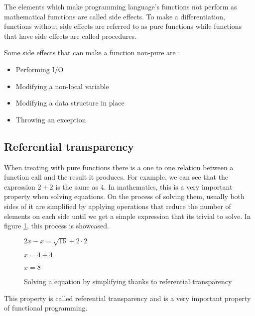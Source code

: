 \documentclass[../main.tex]{subfiles}
\begin{document}
The elements which make programming language's functions not perform as mathematical functions
are called side effects. To make a differentiation, functions without side
effects are referred to as pure functions\autocite{UsingAttributes} while
functions that have side effects are called procedures.

Some side effects that can make a function non-pure are
\autocite{SpulerCompilerEffects}:

\begin{itemize}
  \item Performing I/O
  \item Modifying a non-local variable
  \item Modifying a data structure in place
  \item Throwing an exception
\end{itemize}

%


\subsection{Referential transparency} When treating with pure functions there is
a one to one relation between a function call and the result it produces. For
example, we can see that the expression $2 + 2$ is the same as $4$. In
mathematics, this is a very important property when solving equations. On the
process of solving them, usually both sides of it are simplified by applying
operations that reduce the number of elements on each side until we get a simple
expression that its trivial to solve. In figure \ref{fig:refequation}, this
process is showcased.

\begin{figure}[ht]
  \centering
  $ 2x - x = \sqrt{16} + 2 \cdot 2$

  $ x = 4 + 4$

  $ x = 8 $
  \caption{\label{fig:refequation} Solving a equation by simplifying thanks to
    referential transparency}
\end{figure}


This property is called referential transparency
\autocite{Strachey2000FundamentalLanguages} and is a very important property of
functional programming.
\end{document}
